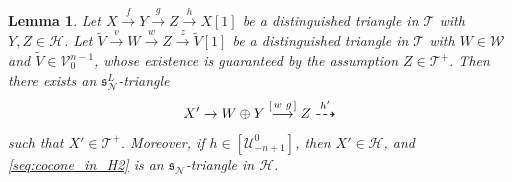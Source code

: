 \documentclass[a4paper,reqno,10pt]{amsart}
\DeclareRobustCommand{\darkblueedit}[1]{#1}
\newtheorem{lemma}[lemma]{Lemma}
\theoremstyle{definition}
\theoremstyle{definition}
\theoremstyle{definition}
\theoremstyle{definition}
\theoremstyle{plain}
\newcommand{\lra}{\longrightarrow}
\newcommand{\dra}{\dashrightarrow}
\newcommand{\fs}{\mathfrak{s}}
\newcommand{\CH}{\mathcal{H}}
\newcommand{\CN}{\mathcal{N}}
\newcommand{\CT}{\mathcal{T}}
\newcommand{\CU}{\mathcal{U}}
\newcommand{\CV}{\mathcal{V}}
\newcommand{\CW}{\mathcal{W}}
\begin{document}
\begin{lemma}\label{lem:cocone_in_H2}
Let $X\xrightarrow{f}Y\xrightarrow{g}Z\xrightarrow{h}X[1]$ be a distinguished triangle in $\CT$ with $Y,Z\in\CH$. Let $\widetilde{V}\xrightarrow{v}W\xrightarrow{w}Z\xrightarrow{z} \widetilde{V}[1]$ be a distinguished triangle in $\CT$ with $W\in\CW$ and $\widetilde{V}\in\CV_0^{n-1}$, whose existence is guaranteed by the assumption $Z\in\CT^+$.
Then there exists an $\fs_\CN^L$-triangle \begin{equation}\label{seq:cocone_in_H2}
X'\to W\oplus Y\overset{\begin{bsmallmatrix}
w & g
\end{bsmallmatrix}}{\lra}Z\overset{h'}{\dra}
\end{equation}
such that %
$X'\in\CT^+$.
\darkblueedit{Moreover, if} $h\in[\CU_{-n+1}^0]$, then
\color{blue}
$X'\in\CH$, and 
\normalcolor
\eqref{seq:cocone_in_H2} is an $\fs_\CN$-triangle in $\CH$.
\end{lemma}
\end{document}
